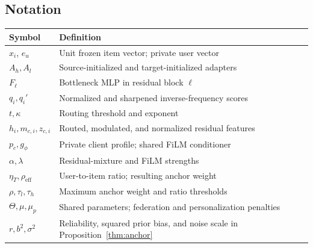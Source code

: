 \subsection{Notation}
\label{app:notation}
\par\addvspace{3pt}\noindent\begin{minipage}{\columnwidth}\centering\footnotesize
{}
\label{tab:notation}
\setlength{\tabcolsep}{3pt}
\begin{tabularx}{\columnwidth}{@{}lX@{}}
\toprule
Symbol & Definition \\
\midrule
$x_i$, $e_u$ & Unit frozen item vector; private user vector \\
$A_h,A_l$ & Source-initialized and target-initialized adapters \\
$F_\ell$ & Bottleneck MLP in residual block $\ell$ \\
$q_i,q_i'$ & Normalized and sharpened inverse-frequency scores \\
$t,\kappa$ & Routing threshold and exponent \\
$h_i,m_{c,i},z_{c,i}$ & Routed, modulated, and normalized residual features \\
$p_c,g_\phi$ & Private client profile; shared FiLM conditioner \\
$\alpha,\lambda$ & Residual-mixture and FiLM strengths \\
$\eta_T,\rho_{\mathrm{eff}}$ & User-to-item ratio; resulting anchor weight \\
$\rho,\tau_l,\tau_h$ & Maximum anchor weight and ratio thresholds \\
$\Theta,\mu,\mu_p$ & Shared parameters; federation and personalization penalties \\
$r,b^2,\sigma^2$ & Reliability, squared prior bias, and noise scale in Proposition~\ref{thm:anchor} \\
\bottomrule
\end{tabularx}
\end{minipage}\par\addvspace{3pt}

